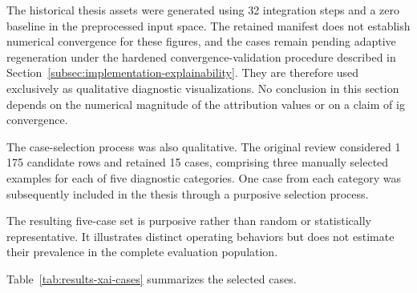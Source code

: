 The historical thesis assets were generated using 32 integration steps and a
zero baseline in the preprocessed input space. The retained manifest does not
establish numerical convergence for these figures, and the cases remain
pending adaptive regeneration under the hardened convergence-validation
procedure described in
Section~\ref{subsec:implementation-explainability}. They are therefore used
exclusively as qualitative diagnostic visualizations. No conclusion in this
section depends on the numerical magnitude of the attribution values or on a
claim of \gls{ig} convergence.

The case-selection process was also qualitative. The original review considered
1\,175 candidate rows and retained 15 cases, comprising three manually selected
examples for each of five diagnostic categories. One case from each category
was subsequently included in the thesis through a purposive selection process.

The resulting five-case set is purposive rather than random or statistically
representative. It illustrates distinct operating behaviors but does not
estimate their prevalence in the complete evaluation population.

Table~\ref{tab:results-xai-cases} summarizes the selected cases.

